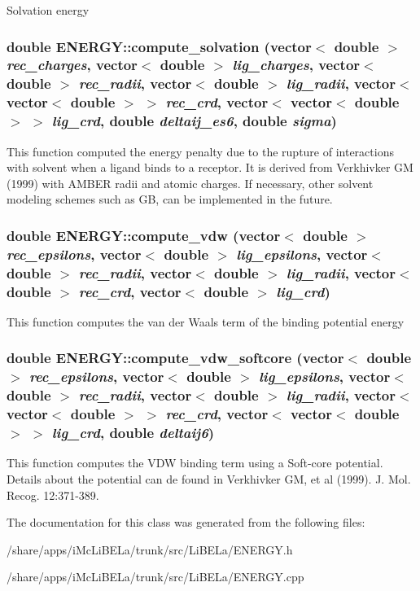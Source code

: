 Solvation energy \hypertarget{classENERGY_a712ccab3019a6cb120b2b49e5391898c}{
\subsubsection[{compute\_\-solvation}]{\setlength{\rightskip}{0pt plus 5cm}double ENERGY::compute\_\-solvation (vector$<$ double $>$ {\em rec\_\-charges}, \/  vector$<$ double $>$ {\em lig\_\-charges}, \/  vector$<$ double $>$ {\em rec\_\-radii}, \/  vector$<$ double $>$ {\em lig\_\-radii}, \/  vector$<$ vector$<$ double $>$ $>$ {\em rec\_\-crd}, \/  vector$<$ vector$<$ double $>$ $>$ {\em lig\_\-crd}, \/  double {\em deltaij\_\-es6}, \/  double {\em sigma})}}
\label{classENERGY_a712ccab3019a6cb120b2b49e5391898c}
This function computed the energy penalty due to the rupture of interactions with solvent when a ligand binds to a receptor. It is derived from Verkhivker GM (1999) with AMBER radii and atomic charges. If necessary, other solvent modeling schemes such as GB, can be implemented in the future. \hypertarget{classENERGY_a8c733b5450a52c8ed45709bb7c83fea3}{
\subsubsection[{compute\_\-vdw}]{\setlength{\rightskip}{0pt plus 5cm}double ENERGY::compute\_\-vdw (vector$<$ double $>$ {\em rec\_\-epsilons}, \/  vector$<$ double $>$ {\em lig\_\-epsilons}, \/  vector$<$ double $>$ {\em rec\_\-radii}, \/  vector$<$ double $>$ {\em lig\_\-radii}, \/  vector$<$ double $>$ {\em rec\_\-crd}, \/  vector$<$ double $>$ {\em lig\_\-crd})}}
\label{classENERGY_a8c733b5450a52c8ed45709bb7c83fea3}
This function computes the van der Waals term of the binding potential energy \hypertarget{classENERGY_a4751b0e8d0d3ce83b2f447236b7e8e38}{
\subsubsection[{compute\_\-vdw\_\-softcore}]{\setlength{\rightskip}{0pt plus 5cm}double ENERGY::compute\_\-vdw\_\-softcore (vector$<$ double $>$ {\em rec\_\-epsilons}, \/  vector$<$ double $>$ {\em lig\_\-epsilons}, \/  vector$<$ double $>$ {\em rec\_\-radii}, \/  vector$<$ double $>$ {\em lig\_\-radii}, \/  vector$<$ vector$<$ double $>$ $>$ {\em rec\_\-crd}, \/  vector$<$ vector$<$ double $>$ $>$ {\em lig\_\-crd}, \/  double {\em deltaij6})}}
\label{classENERGY_a4751b0e8d0d3ce83b2f447236b7e8e38}
This function computes the VDW binding term using a Soft-\/core potential. Details about the potential can de found in Verkhivker GM, et al (1999). J. Mol. Recog. 12:371-\/389. 

The documentation for this class was generated from the following files:\begin{DoxyCompactItemize}
\item 
/share/apps/iMcLiBELa/trunk/src/LiBELa/ENERGY.h\item 
/share/apps/iMcLiBELa/trunk/src/LiBELa/ENERGY.cpp\end{DoxyCompactItemize}
